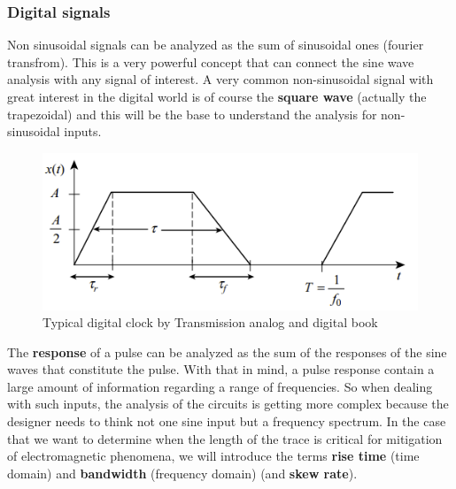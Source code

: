 \documentclass[final]{cubedoc}
\begin{document}
	
	\subsubsection{Digital signals}
	
	Non sinusoidal signals can be analyzed as the sum of sinusoidal ones (fourier transfrom). This is a very powerful concept that can connect the sine wave analysis with any signal of interest. A very common non-sinusoidal signal with great interest in the digital world is of course the \textbf{square wave} (actually the trapezoidal) and this will be the base to understand the analysis for non-sinusoidal inputs.
	
	\begin{figure}[h!]
		\centering
		\includegraphics[keepaspectratio, width = \textwidth]{assets/clock_signal.png}
		\caption{Typical digital clock by Transmission analog and digital book}
	\end{figure}
	
	
	The \textbf{response} of a pulse can be analyzed as the sum of the responses of the sine waves that constitute the pulse. With that in mind, a pulse response contain a large amount of information regarding a range of frequencies. So when dealing with such inputs, the analysis of the circuits is getting more complex because the designer needs to think not one sine input but a frequency spectrum. In the case that we want to determine when the length of the trace is critical for mitigation of electromagnetic phenomena, we will introduce the terms \textbf{rise time} (time domain) and \textbf{bandwidth} (frequency domain) (and \textbf{skew rate}).
	
\end{document}
